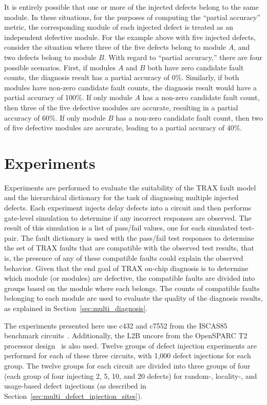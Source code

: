 It is entirely possible that one or more of the injected defects belong to the same module.
%
In these situations, for the purposes of computing the ``partial accuracy'' metric, the corresponding module of each injected defect is treated as an independent defective module.
%
For the example above with five injected defects, consider the situation where three of the five defects belong to module $A$, and two defects belong to module $B$.
%
With regard to ``partial accuracy,'' there are four possible scenarios.
%
First, if modules $A$ and $B$ both have zero candidate fault counts, the diagnosis result has a partial accuracy of 0\%.
%
Similarly, if both modules have non-zero candidate fault counts, the diagnosis result would have a partial accuracy of 100\%.
%
If only module $A$ has a non-zero candidate fault count, then three of the five defective modules are accurate, resulting in a partial accuracy of 60\%.
%
If only module $B$ has a non-zero candidate fault count, then two of five defective modules are accurate, leading to a partial accuracy of 40\%.

\section{Experiments}
\label{sec:multi_experiments}

Experiments are performed to evaluate the suitability of the TRAX fault model and the hierarchical dictionary for the task of diagnosing multiple injected defects.
%
Each experiment injects delay defects into a circuit and then performs gate-level simulation to determine if any incorrect responses are observed.
%
The result of this simulation is a list of pass/fail values, one for each simulated test-pair.
%
The fault dictionary is used with the pass/fail test responses to determine the set of TRAX faults that are compatible with the observed test results, that is, the presence of any of these compatible faults could explain the observed behavior.
%
Given that the end goal of TRAX on-chip diagnosis is to determine which module (or modules) are defective, the compatible faults are divided into groups based on the module where each belongs.
%
The counts of compatible faults belonging to each module are used to evaluate the quality of the diagnosis results, as explained in Section~\ref{sec:multi_diagnosis}.

The experiments presented here use c432 and c7552 from the ISCAS85 benchmark circuits~\cite{brglez85}.
%
Additionally, the L2B uncore from the OpenSPARC T2 processor design~\cite{sun11} is also used.
%
Twelve groups of defect injection experiments are performed for each of these three circuits, with 1,000 defect injections for each group.
%
The twelve groups for each circuit are divided into three groups of four (each group of four injecting 2, 5, 10, and 20 defects) for random-, locality-, and usage-based defect injections (as described in Section~\ref{sec:multi_defect_injection_sites}).

